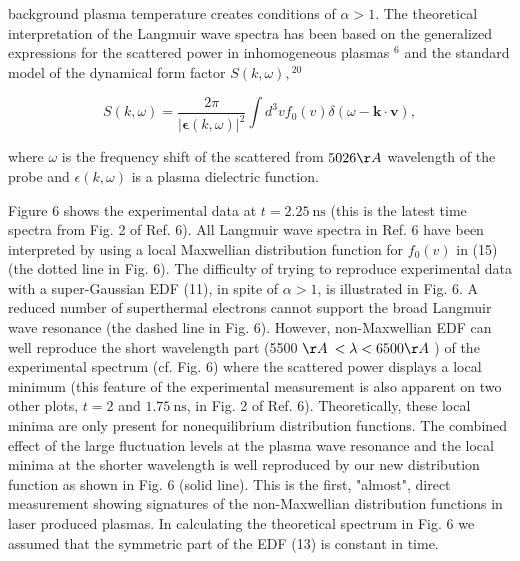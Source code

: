 \documentclass[oneside,onecolumn]{article}
\begin{document}
\begin{sloppypar}
 background plasma temperature creates conditions of $\alpha>1$. The theoretical interpretation of the Langmuir wave spectra has been based on the generalized expressions for the scattered power in inhomogeneous plasmas $^{6}$ and the standard model of the dynamical form factor $S(k, \omega),{ }^{20}$
 
 \begin{dmath}[compact]
 S(k, \omega)=\frac{2 \pi}{|\boldsymbol{\epsilon}(k, \omega)|^{2}} \int d^{3} v f_{0}(v) \delta(\omega-\mathbf{k} \cdot \mathbf{v}),
 \end{dmath}
 
 where $\omega$ is the frequency shift of the scattered from $5026 \AA$ wavelength of the probe and $\epsilon(k, \omega)$ is a plasma dielectric function.
 
 Figure 6 shows the experimental data at $t=2.25 \mathrm{~ns}$ (this is the latest time spectra from Fig. 2 of Ref. 6). All Langmuir wave spectra in Ref. 6 have been interpreted by using a local Maxwellian distribution function for $f_{0}(v)$ in (15) (the dotted line in Fig. 6). The difficulty of trying to reproduce experimental data with a super-Gaussian EDF (11), in spite of $\alpha>1$, is illustrated in Fig. 6. A reduced number of superthermal electrons cannot support the broad Langmuir wave resonance (the dashed line in Fig. 6). However, non-Maxwellian EDF can well reproduce the short wavelength part (5500 $\AA$ $<\lambda<6500 \AA$ ) of the experimental spectrum (cf. Fig. 6) where the scattered power displays a local minimum (this feature of the experimental measurement is also apparent on two other plots, $t=2$ and $1.75 \mathrm{~ns}$, in Fig. 2 of Ref. 6). Theoretically, these local minima are only present for nonequilibrium distribution functions. The combined effect of the large fluctuation levels at the plasma wave resonance and the local minima at the shorter wavelength is well reproduced by our new distribution function as shown in Fig. 6 (solid line). This is the first, "almost", direct measurement showing signatures of the non-Maxwellian distribution functions in laser produced plasmas. In calculating the theoretical spectrum in Fig. 6 we assumed that the symmetric part of the EDF (13) is constant in time.
 

\end{sloppypar}
\end{document}
